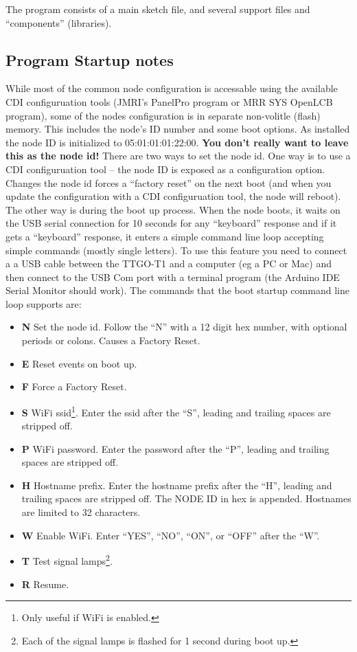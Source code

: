 The program consists of a main sketch file, and several support files and
``components'' (libraries).

\subsection{Program Startup notes}

While most of the common node configuration is accessable using the available
CDI configuruation tools (JMRI's PanelPro program or MRR SYS OpenLCB program), 
some of the nodes configuration is in separate non-volitle (flash) memory.  
This includes the node's ID number and some boot options.  As installed the 
node ID is initialized to 05:01:01:01:22:00.  \textbf{You don't really want to 
leave this as the node id!}  There are two ways to set the node id.  One way 
is to use a CDI configuruation tool -- the node ID is exposed as a 
configuration option.  Changes the node id forces a ``factory reset'' on the 
next boot (and when you update the configuration with a CDI configuruation 
tool, the node will reboot).  The other way is during the boot up process.  
When the node boots, it waits on the USB serial connection for 10 seconds for 
any ``keyboard'' response and if it gets a ``keyboard'' response, it enters a 
simple command line loop accepting simple commands (mostly single letters). 
To use this feature you need to connect a a USB cable between the TTGO-T1 and 
a computer (eg a PC or Mac) and then connect to the USB Com port with a 
terminal program (the Arduino IDE Serial Monitor should work).  The commands 
that the boot startup command line loop supports are:

\begin{itemize}
\item \textbf{N} Set the node id.  Follow the ``N'' with a 12 digit hex 
number, with optional periods or colons.  Causes a Factory Reset.
\item \textbf{E} Reset events on boot up.
\item \textbf{F} Force a Factory Reset.
\item \textbf{S} WiFi ssid\footnote{Only useful if WiFi is 
enabled.\label{fn:wifi}}. Enter the ssid after the ``S'', leading and trailing 
spaces are stripped off.
\item \textbf{P} WiFi password. Enter the password after the 
``P'', leading and trailing spaces are stripped off.
\item \textbf{H} Hostname prefix. Enter the hostname prefix 
after the ``H'', leading and trailing spaces are stripped off. The NODE ID in 
hex is appended.  Hostnames are limited to 32 characters.
\item \textbf{W} Enable WiFi. Enter ``YES'', ``NO'', 
``ON'', or ``OFF'' after the ``W''.
\item \textbf{T} Test signal lamps\footnote{Each of the signal lamps is 
flashed for 1 second during boot up.}.
\item \textbf{R} Resume.
\end{itemize}

